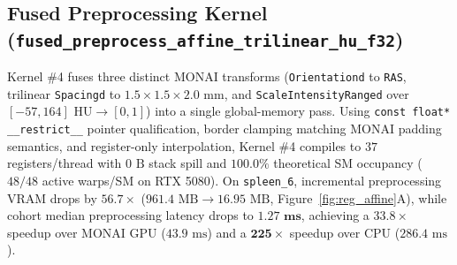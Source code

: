 \documentclass[10pt,twocolumn]{article}
\begin{document}
\subsection{Fused Preprocessing Kernel (\texttt{fused\_\allowbreak preprocess\_\allowbreak affine\_\allowbreak trilinear\_\allowbreak hu\_f32})}
Kernel \#4 fuses three distinct MONAI transforms (\texttt{Orientationd} to \texttt{RAS}, trilinear \texttt{Spacingd} to $1.5 \times 1.5 \times 2.0\text{ mm}$, and \texttt{ScaleIntensityRanged} over $[-57, 164]\text{ HU} \to [0, 1]$) into a single global-memory pass. Using \texttt{const float* \_\_restrict\_\_} pointer qualification, border clamping matching MONAI padding semantics, and register-only interpolation, Kernel \#4 compiles to $37$ registers/thread with $0\text{ B}$ stack spill and $100.0\%$ theoretical SM occupancy ($48/48$ active warps/SM on RTX 5080). On \texttt{spleen\_6}, incremental preprocessing VRAM drops by $\mathbf{56.7\times}$ ($961.4\text{ MB} \to 16.95\text{ MB}$, Figure~\ref{fig:reg_affine}A), while cohort median preprocessing latency drops to $\mathbf{1.27\textbf{ ms}}$, achieving a $\mathbf{33.8\times}$ speedup over MONAI GPU ($43.9\text{ ms}$) and a $\mathbf{225\times}$ speedup over CPU ($286.4\text{ ms}$).
\end{document}
